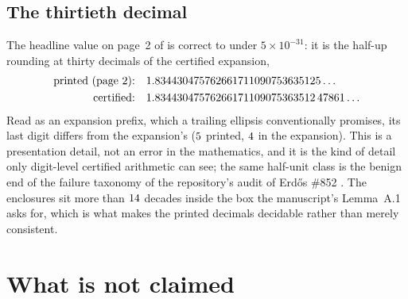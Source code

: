 \documentclass[11pt]{article}
\begin{document}
\subsection{The thirtieth decimal}

The headline value on page~2 of \cite{DPT} is correct to under $5\times10^{-31}$: it is the
half-up rounding at thirty decimals of the certified expansion,
\[
\begin{aligned}
\text{printed (page 2):}\quad & 1.834430475762661711090753635125\ldots\\
\text{certified:}\quad & 1.83443047576266171109075363512\,47861\ldots
\end{aligned}
\]
Read as an expansion prefix, which a trailing ellipsis conventionally promises, its last digit
differs from the expansion's ($5$ printed, $4$ in the
expansion). This is a presentation detail, not an error in the mathematics, and it is the kind
of detail only digit-level certified arithmetic can see; the same half-unit class is the benign
end of the failure taxonomy of the repository's audit of Erd\H{o}s \#852 \cite{Repo}. The
enclosures sit more than $14$ decades inside the box the manuscript's Lemma~A.1
asks for, which is what makes the printed decimals decidable rather than merely consistent.

\section{What is not claimed}\label{sec:notclaimed}
\end{document}
